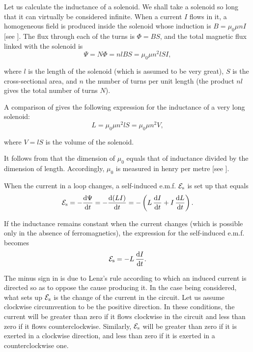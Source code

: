Let us calculate the inductance of a solenoid.
We shall take a solenoid so long that it can virtually be considered infinite.
When a current $I$ flows in it, a homogeneous field is produced inside the solenoid whose induction is $B=\mu_0\mu nI$ [see ].
The flux through each of the turns is $\Phi=BS$, and the total magnetic flux linked with the solenoid is
\begin{equation}\label{eq:8_13}
	\Psi = N\Phi = nlBS = \mu_0 \mu n^2 l S I,
\end{equation}

\noindent
where $l$ is the length of the solenoid (which is assumed to be very great), $S$ is the cross-sectional area, and $n$ the number of turns per unit length (the product $nl$ gives the total number of turns $N$).

A comparison of  gives the following expression for the inductance of a very long solenoid:
\begin{equation}\label{eq:8_14}
	L = \mu_0 \mu n^2 l S = \mu_0 \mu n^2 V,
\end{equation}

\noindent
where $V = lS$ is the volume of the solenoid.

It follows from  that the dimension of $\mu_0$ equals that of inductance divided by the dimension of length.
Accordingly, $\mu_0$ is measured in henry per metre [see ].

When the current in a loop changes, a self-induced e.m.f. $\mathcal{E}_{\text{s}}$ is set up that equals
\vspace{-12pt}
\begin{equation}\label{eq:8_15}
	\mathcal{E}_{\text{s}} = - \dfrac{\mathrm{d}\Psi}{\mathrm{d} t} = - \dfrac{\mathrm{d}(LI)}{\mathrm{d} t} = - \left(L\, \dfrac{\mathrm{d} I}{\mathrm{d} t} + I\, \dfrac{\mathrm{d} L}{\mathrm{d} t}\right).
\end{equation}

\noindent
If the inductance remains constant when the current changes (which is possible only in the absence of ferromagnetics), the expression for the self-induced e.m.f. becomes
\begin{equation}\label{eq:8_16}
	\mathcal{E}_{\text{s}} = - L\, \dfrac{\mathrm{d} I}{\mathrm{d} t}.
\end{equation}

\noindent
The minus sign in  is due to Lenz's rule according to which an induced current is directed so as to oppose the cause producing it.
In the case being considered, what sets up $\mathcal{E}_{\text{s}}$ is the change of the current in the circuit.
Let us assume clockwise circumvention to be the positive direction.
In these conditions, the current will be greater than zero if it flows clockwise in the circuit and less than zero if it flows counterclockwise.
Similarly, $\mathcal{E}_{\text{s}}$ will be greater than
zero if it is exerted in a clockwise direction, and less than zero if it is exerted in a counterclockwise one.

